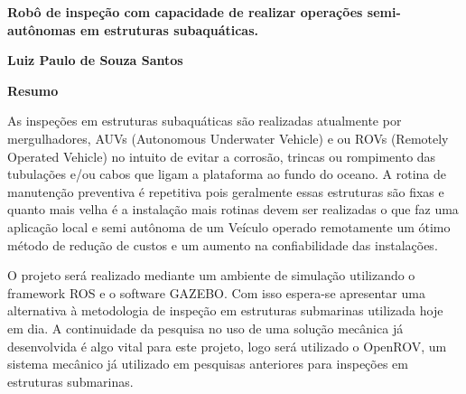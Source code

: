 \newpage
\thispagestyle{empty}
\begin{center}
 \vspace*{2cm}
\end{center}


\newpage
\thispagestyle{empty}
\begin{center}
  \textbf{\Large Robô de inspeção com capacidade de realizar operações semi-autônomas em estruturas subaquáticas.
  }

  \vspace*{1cm}
  \textbf{\large Luiz Paulo de Souza Santos}

  \vspace*{2cm}

  \textbf{\large Resumo}
\end{center}

As inspeções em estruturas subaquáticas são realizadas atualmente por mergulhadores, AUVs (Autonomous Underwater Vehicle) e ou ROVs  (Remotely Operated Vehicle) no intuito de evitar a corrosão, trincas ou rompimento das tubulações e/ou cabos que ligam a plataforma ao fundo do oceano. A rotina de manutenção preventiva é repetitiva pois geralmente essas estruturas são fixas e quanto mais velha é a instalação mais rotinas devem ser realizadas o que faz uma aplicação local e semi autônoma de um Veículo operado remotamente um ótimo método de redução de custos e um aumento na confiabilidade das instalações.

O projeto será realizado mediante um ambiente de simulação utilizando o framework ROS e o software GAZEBO. Com isso espera-se apresentar uma alternativa à metodologia de inspeção em estruturas submarinas utilizada hoje em dia. A continuidade da pesquisa no uso de uma solução mecânica já desenvolvida é algo vital para este projeto, logo será utilizado o OpenROV, um sistema mecânico já utilizado em pesquisas anteriores para inspeções em estruturas submarinas.


